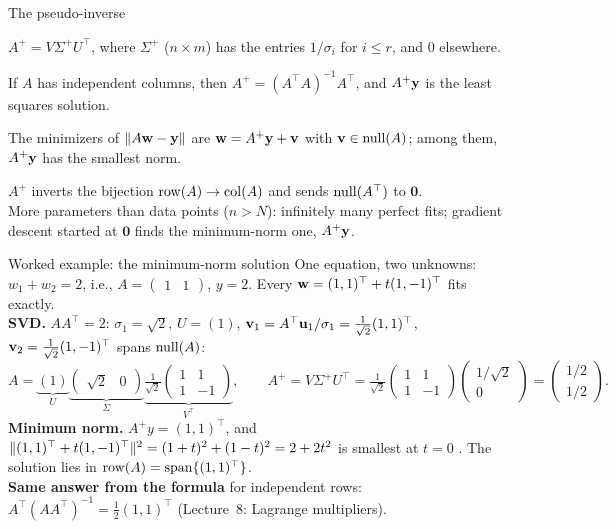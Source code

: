 \documentclass[aspectratio=1610,11pt]{beamer}
\begin{document}
\begin{frame}{The pseudo-inverse}
    \begin{definition}
        \small $A^+ = V\Sigma^+U^\top$, where $\Sigma^+$ ($n \times m$) has the entries $1/\sigma_i$ for $i \leq r$, and $0$ elsewhere.
    \end{definition}
    \begin{proposition}
        \small If $A$ has independent columns, then $A^+ = (A^\top A)^{-1}A^\top$, and $A^+\mathbf{y}$ is the least squares solution.
    \end{proposition}
    \begin{proposition}
        \small The minimizers of $\lVert A\mathbf{w} - \mathbf{y} \rVert$ are $\mathbf{w} = A^+\mathbf{y} + \mathbf{v}$ with $\mathbf{v} \in \operatorname{null}(A)$; among them, $A^+\mathbf{y}$ has the smallest norm.
    \end{proposition}
    \small
    $A^+$ inverts the bijection $\operatorname{row}(A) \to \operatorname{col}(A)$ and sends $\operatorname{null}(A^\top)$ to $\mathbf{0}$. \\
    \textcolor{mlcolor}{More parameters than data points ($n > N$): infinitely many perfect fits; gradient descent started at $\mathbf{0}$ finds the minimum-norm one, $A^+\mathbf{y}$.}
\end{frame}

\begin{frame}{Worked example: the minimum-norm solution}
    \small
    One equation, two unknowns: $w_1 + w_2 = 2$, i.e., $A = \begin{pmatrix} 1 & 1 \end{pmatrix}$, $y = 2$. Every $\mathbf{w} = (1, 1)^\top + t(1, -1)^\top$ fits exactly.
    \\[0.4em]
    \textbf{SVD.} $AA^\top = 2$: $\sigma_1 = \sqrt2$, $U = (1)$, $\mathbf{v}_1 = A^\top\mathbf{u}_1/\sigma_1 = \frac{1}{\sqrt2}(1, 1)^\top$, \ $\mathbf{v}_2 = \frac{1}{\sqrt2}(1, -1)^\top$ spans $\operatorname{null}(A)$:
    \[A = \underbrace{(1)}_{U}\underbrace{\begin{pmatrix} \sqrt2 & 0 \end{pmatrix}}_{\Sigma}\underbrace{\tfrac{1}{\sqrt2}\begin{pmatrix} 1 & 1 \\ 1 & -1 \end{pmatrix}}_{V^\top}, \qquad A^+ = V\Sigma^+U^\top = \tfrac{1}{\sqrt2}\begin{pmatrix} 1 & 1 \\ 1 & -1 \end{pmatrix}\begin{pmatrix} 1/\sqrt2 \\ 0 \end{pmatrix} = \begin{pmatrix} 1/2 \\ 1/2 \end{pmatrix}.\]
    \textbf{Minimum norm.} $A^+y = (1, 1)^\top$, and $\lVert (1, 1)^\top + t(1, -1)^\top \rVert^2 = (1 + t)^2 + (1 - t)^2 = 2 + 2t^2$ is smallest at $t = 0$ \checkmark. The solution lies in $\operatorname{row}(A) = \operatorname{span}\{(1, 1)^\top\}$.
    \\[0.4em]
    \textbf{Same answer from the formula} for independent rows: $A^\top(AA^\top)^{-1} = \frac{1}{2}(1, 1)^\top$ (Lecture~8: Lagrange multipliers).
\end{frame}
\end{document}
